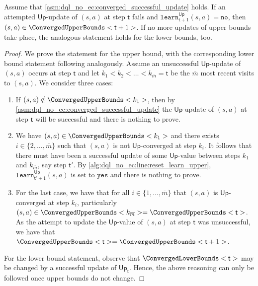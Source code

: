 \documentclass{theoretics}
\newcommand{\upperbound}{\mathsf{Up}}
\newcommand{\delay}{{\overline{m}}}
\newcommand{\learn}{\texttt{learn}}
\newcommand{\learnyes}{\texttt{yes}}
\newcommand{\learnno}{\texttt{no}}
\newcommand{\algostep}{\mathsf{t}}
\begin{document}
\begin{lemma} \label{stm:dql_no_ec:unsuccessful_update_means_converged}
	Assume that \cref{asm:dql_no_ec:converged_successful_update} holds.
	If an attempted $\upperbound$-update of $(s, a)$ at step $\algostep$ fails and $\learn^\upperbound_{\algostep+1}(s, a) = \learnno$, then $(s, a) \in \ConvergedUpperBounds<\algostep+1>$.
	If no more updates of upper bounds take place, the analogous statement holds for the lower bounds, too.
\end{lemma}

\begin{proof}
	We prove the statement for the upper bound, with the corresponding lower bound statement following analogously.
	Assume an unsuccessful $\upperbound$-update of $(s, a)$ occurs at step $\algostep$ and let $k_1 < k_2 < \ldots < k_\delay = \algostep$ be the $\delay$ most recent visits to $(s, a)$.
	We consider three cases:
	\begin{enumerate}
		\item
		If $(s, a) \notin \ConvergedUpperBounds<k_1>$, then by \cref{asm:dql_no_ec:converged_successful_update} the $\upperbound$-update of $(s, a)$ at step $\algostep$ will be successful and there is nothing to prove.

		\item
		We have $(s, a) \in \ConvergedUpperBounds<k_1>$ and there exists $i \in \{2, \ldots, \delay\}$ such that $(s, a)$ is not $\upperbound$-converged at step $k_i$.
		It follows that there must have been a successful update of some $\upperbound$-value between steps $k_1$ and $k_\delay$, say step $\algostep'$.
		By \cref{alg:dql_no_ec:line:reset_learn_upper}, $\learn_{\algostep' + 1}^\upperbound(s, a)$ is set to $\learnyes$ and there is nothing to prove.

		\item
		For the last case, we have that for all $i \in \{1, \ldots, \delay\}$ that $(s, a)$ is $\upperbound$-converged at step $k_i$, particularly $(s, a) \in \ConvergedUpperBounds<k_{\delay}> = \ConvergedUpperBounds<\algostep>$.
		As the attempt to update the $\upperbound$-value of $(s, a)$ at step $\algostep$ was unsuccessful, we have that $\ConvergedUpperBounds<\algostep> = \ConvergedUpperBounds<\algostep+1>$.
	\end{enumerate}
	For the lower bound statement, observe that $\ConvergedLowerBounds<\algostep>$ may be changed by a successful update of $\upperbound_\algostep$.
	Hence, the above reasoning can only be followed once upper bounds do not change. 
\end{proof}
\end{document}
